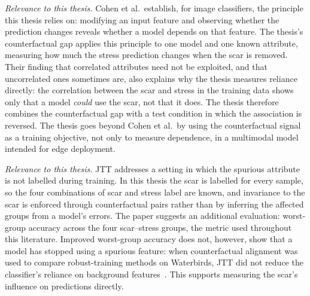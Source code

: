 \textit{Relevance to this thesis.} Cohen et al.\ establish, for image classifiers, the principle this thesis relies on: modifying an input feature and observing whether the prediction changes reveals whether a model depends on that feature. The thesis's counterfactual gap applies this principle to one model and one known attribute, measuring how much the stress prediction changes when the scar is removed. Their finding that correlated attributes need not be exploited, and that uncorrelated ones sometimes are, also explains why the thesis measures reliance directly: the correlation between the scar and stress in the training data shows only that a model \emph{could} use the scar, not that it does. The thesis therefore combines the counterfactual gap with a test condition in which the association is reversed. The thesis goes beyond Cohen et al.\ by using the counterfactual signal as a training objective, not only to measure dependence, in a multimodal model intended for edge deployment.


\textit{Relevance to this thesis.} JTT addresses a setting in which the spurious attribute is not labelled during training. In this thesis the scar is labelled for every sample, so the four combinations of scar and stress label are known, and invariance to the scar is enforced through counterfactual pairs rather than by inferring the affected groups from a model's errors. The paper suggests an additional evaluation: worst-group accuracy across the four scar--stress groups, the metric used throughout this literature. Improved worst-group accuracy does not, however, show that a model has stopped using a spurious feature: when counterfactual alignment was used to compare robust-training methods on Waterbirds, JTT did not reduce the classifier's reliance on background features~\cite{cohen2025}. This supports measuring the scar's influence on predictions directly.


